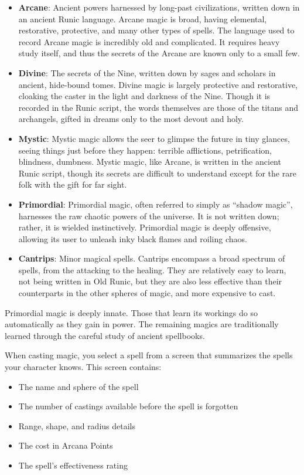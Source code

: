 \begin{itemize}
\item {\bf Arcane}: Ancient powers harnessed by long-past civilizations,
written down in an ancient Runic language.  Arcane magic is broad, having
elemental, restorative, protective, and many other types of spells.  The
language used to record Arcane magic is incredibly old and complicated.  It
requires heavy study itself, and thus the secrets of the Arcane are known
only to a small few.
\item {\bf Divine}: The secrets of the Nine, written down by sages and
scholars in ancient, hide-bound tomes.  Divine magic is largely
protective and restorative, cloaking the caster in the light and darkness
of the Nine.  Though it is recorded in the Runic script, the words
themselves are those of the titans and archangels, gifted in dreams only
to the most devout and holy.
\item {\bf Mystic}: Mystic magic allows the seer to glimpse the future in
tiny glances, seeing things just before they happen: terrible afflictions,
petrification, blindness, dumbness.  Mystic magic, like Arcane, is written
in the ancient Runic script, though its secrets are difficult to understand
except for the rare folk with the gift for far sight.
\item {\bf Primordial}: Primordial magic, often referred to simply as
``shadow magic'', harnesses the raw chaotic powers of the universe.  It is 
not written down; rather, it is wielded instinctively.  Primordial magic is
deeply offensive, allowing its user to unleash inky black flames and roiling
chaos.
\item {\bf Cantrips}: Minor magical spells.  Cantrips encompass a broad
spectrum of spells, from the attacking to the healing.  They are relatively
easy to learn, not being written in Old Runic, but they are also less
effective than their counterparts in the other spheres of magic, and more
expensive to cast.

\end{itemize}

Primordial magic is deeply innate.  Those that learn its workings do so
automatically as they gain in power.  The remaining magics are
traditionally learned through the careful study of ancient spellbooks.

When casting magic, you select a spell from a screen that summarizes
the spells your character knows.  This screen contains:

\begin{itemize}
\item The name and sphere of the spell
\item The number of castings available before the spell is forgotten
\item Range, shape, and radius details
\item The cost in Arcana Points
\item The spell's effectiveness rating
\end{itemize}


